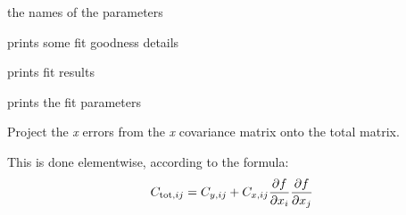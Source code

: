 \documentclass[a4paper,10pt,english]{sphinxmanual}
\begin{document}
\begin{fulllineitems}

\begin{fulllineitems}
\label{index:kafe.fit.Fit.parameter_names}
the names of the parameters

\end{fulllineitems}


\begin{fulllineitems}
\label{index:kafe.fit.Fit.print_fit_details}
prints some fit goodness details

\end{fulllineitems}


\begin{fulllineitems}
\label{index:kafe.fit.Fit.print_fit_results}
prints fit results

\end{fulllineitems}


\begin{fulllineitems}
\label{index:kafe.fit.Fit.print_rounded_fit_parameters}
prints the fit parameters

\end{fulllineitems}


\begin{fulllineitems}
\label{index:kafe.fit.Fit.project_x_covariance_matrix}
Project the \emph{x} errors from the \emph{x} covariance matrix onto the total
matrix.

This is done elementwise, according to the formula:
\begin{gather}
\begin{split}C_{\text{tot}, ij} = C_{y, ij} + C_{x, ij}
\frac{\partial f}{\partial x_i}  \frac{\partial f}{\partial x_j}\end{split}\notag
\end{gather}
\end{fulllineitems}


\end{fulllineitems}
\end{document}
